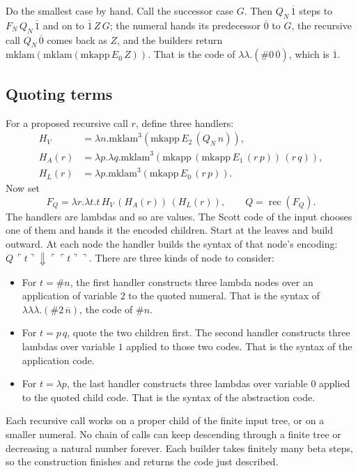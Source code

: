 \documentclass[11pt,twoside]{article}
\theoremstyle{thielethm}
\theoremstyle{thieledef}
\theoremstyle{thieledef}
\theoremstyle{thieledef}
\theoremstyle{thielethm}
\theoremstyle{thieleobs}
\theoremstyle{thielethm}
\begin{document}
Do the smallest case by hand. Call the successor case $G$. Then $Q_N\,\overline1$ steps to
$F_N\,Q_N\,\overline1$ and on to $\overline1\,Z\,G$; the numeral hands its predecessor
$\overline0$ to $G$, the recursive call $Q_N\,\overline0$ comes back as $Z$, and the builders
return $\mathrm{mklam}(\mathrm{mklam}(\mathrm{mkapp}\,E_0\,Z))$. That is the code of
$\lambda\lambda.(\#0\,\overline0)$, which is $\overline1$.

\subsection{Quoting terms}

For a proposed recursive call $r$, define three handlers:
\[
\begin{aligned}
H_V&=\lambda n.\mathrm{mklam}^3(\mathrm{mkapp}\,E_2\,(Q_N\,n)),\\
H_A(r)&=\lambda p.\lambda q.\mathrm{mklam}^3(\mathrm{mkapp}\,(\mathrm{mkapp}\,E_1\,(r\,p))\,(r\,q)),\\
H_L(r)&=\lambda p.\mathrm{mklam}^3(\mathrm{mkapp}\,E_0\,(r\,p)).
\end{aligned}
\]
Now set
\[
F_Q=\lambda r.\lambda t.t\,H_V\,(H_A(r))\,(H_L(r)),
\qquad Q=\operatorname{rec}(F_Q).
\]
The handlers are lambdas and so are values. The Scott code of the input chooses
one of them and hands it the encoded children. Start at the leaves and build
outward. At each node the handler builds the syntax of that node's encoding:
$Q\,\ulcorner t\urcorner\Downarrow\ulcorner\ulcorner t\urcorner\urcorner$. There are
three kinds of node to consider:

\begin{itemize}
\item For $t=\#n$, the first handler constructs three lambda nodes over an application
of variable $2$ to the quoted numeral. That is the syntax of
$\lambda\lambda\lambda.(\#2\,\overline n)$, the code of $\#n$.
\item For $t=p\,q$, quote the two children first. The second handler
constructs three lambdas over variable $1$ applied to those two codes. That is
the syntax of the application code.
\item For $t=\lambda p$, the last handler constructs three lambdas over variable $0$
applied to the quoted child code. That is the syntax of the abstraction code.
\end{itemize}

Each recursive call works on a proper child of the finite input tree, or on a
smaller numeral. No chain of calls can keep descending through a finite tree
or decreasing a natural number forever. Each builder takes finitely many beta
steps, so the construction finishes and returns the code just described.
\end{document}
